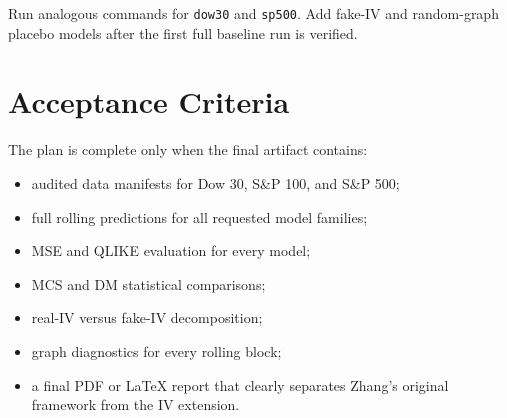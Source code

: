 \documentclass[11pt,a4paper]{article}
\begin{document}
Run analogous commands for \texttt{dow30} and \texttt{sp500}. Add fake-IV and random-graph placebo models after the first full baseline run is verified.

\section{Acceptance Criteria}

The plan is complete only when the final artifact contains:
\begin{itemize}[leftmargin=*]
  \item audited data manifests for Dow 30, S\&P 100, and S\&P 500;
  \item full rolling predictions for all requested model families;
  \item MSE and QLIKE evaluation for every model;
  \item MCS and DM statistical comparisons;
  \item real-IV versus fake-IV decomposition;
  \item graph diagnostics for every rolling block;
  \item a final PDF or LaTeX report that clearly separates Zhang's original framework from the IV extension.
\end{itemize}
\end{document}
